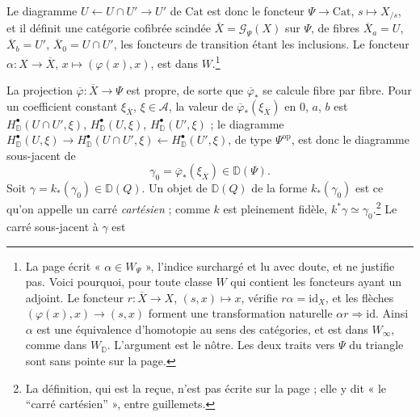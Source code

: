 \documentclass[11pt,a4paper]{article}
\begin{document}
Le diagramme $U \leftarrow U \cap U' \rightarrow U'$ de $\mathrm{Cat}$ est
donc le foncteur $\Psi \to \mathrm{Cat}$, $s \mapsto X_{/s}$, et il définit
une catégorie cofibrée scindée $\overline{X} = \mathcal{G}_\Psi(X)$ sur
$\Psi$, de fibres $\overline{X}_a = U$, $\overline{X}_b = U'$,
$\overline{X}_0 = U \cap U'$, les foncteurs de transition étant les
inclusions. Le foncteur $\alpha : X \to \overline{X}$, $x \mapsto
(\varphi(x), x)$, est dans $W$.\footnote{La page écrit
« $\alpha \in W_{\Psi}$ », l'indice surchargé et lu avec doute, et
ne justifie pas. Voici pourquoi, pour toute classe $W$ qui contient les
foncteurs ayant un adjoint. Le foncteur $r : \overline{X} \to X$, $(s, x)
\mapsto x$, vérifie $r \alpha = \mathrm{id}_X$, et les flèches $(\varphi(x),
x) \to (s, x)$ forment une transformation naturelle $\alpha r \Rightarrow
\mathrm{id}$. Ainsi $\alpha$ est une équivalence d'homotopie au sens des
catégories, et est dans $W_\infty$, comme dans $W_{\mathbb D}$. L'argument est
le nôtre. Les deux traits vers $\Psi$ du triangle sont sans pointe sur la
page.}

La projection $\overline{\varphi} : \overline{X} \to \Psi$ est propre, de
sorte que $\overline{\varphi}_*$ se calcule fibre par fibre. Pour un
coefficient constant $\xi_{\overline{X}}$, $\xi \in \mathcal{A}$, la valeur de
$\overline{\varphi}_*(\xi_{\overline{X}})$ en $0$, $a$, $b$ est
$H^\bullet_{\mathbb D}(U \cap U', \xi)$, $H^\bullet_{\mathbb D}(U, \xi)$,
$H^\bullet_{\mathbb D}(U', \xi)$ ; le diagramme
$H^\bullet_{\mathbb D}(U, \xi) \to H^\bullet_{\mathbb D}(U \cap U', \xi)
\leftarrow H^\bullet_{\mathbb D}(U', \xi)$, de type $\Psi^{\mathrm{op}}$, est
donc le diagramme sous-jacent de
\[
\gamma_0 = \overline{\varphi}_*(\xi_{\overline{X}}) \in \mathbb D(\Psi).
\]
Soit $\gamma = k_*(\gamma_0) \in \mathbb D(Q)$. Un objet de $\mathbb D(Q)$
de la forme $k_*(\gamma_0)$ est ce qu'on appelle un carré
\emph{cartésien} ; comme $k$ est pleinement fidèle, $k^*\gamma \simeq
\gamma_0$.\footnote{La définition, qui est la reçue, n'est pas écrite sur la
page ; elle y dit « le “carré cartésien” », entre guillemets.} Le carré
sous-jacent à $\gamma$ est

\end{document}

